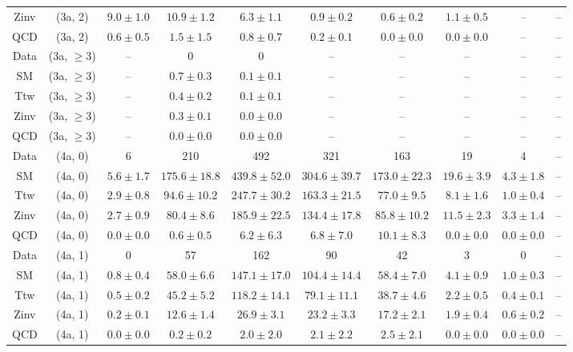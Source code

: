 \begin{table}[h!]
{\begin{tabular}{cccccccccc}
	Zinv & (3a, 2) & $9.0\pm 1.0$ & $10.9\pm 1.2$ & $6.3\pm 1.1$ & $0.9\pm 0.2$ & $0.6\pm 0.2$ & $1.1\pm 0.5$ & -- & -- \\[0.5ex] 
	QCD & (3a, 2) & $0.6\pm 0.5$ & $1.5\pm 1.5$ & $0.8\pm 0.7$ & $0.2\pm 0.1$ & $0.0\pm 0.0$ & $0.0\pm 0.0$ & -- & -- \\[0.5ex] 
	Data & (3a, $\ge3$) & -- & 0 & 0 & -- & -- & -- & -- & -- \\[0.5ex] 
	SM & (3a, $\ge3$) & -- & $0.7\pm 0.3$ & $0.1\pm 0.1$ & -- & -- & -- & -- & -- \\[0.5ex] 
	Ttw & (3a, $\ge3$) & -- & $0.4\pm 0.2$ & $0.1\pm 0.1$ & -- & -- & -- & -- & -- \\[0.5ex] 
	Zinv & (3a, $\ge3$) & -- & $0.3\pm 0.1$ & $0.0\pm 0.0$ & -- & -- & -- & -- & -- \\[0.5ex] 
	QCD & (3a, $\ge3$) & -- & $0.0\pm 0.0$ & $0.0\pm 0.0$ & -- & -- & -- & -- & -- \\[0.5ex] 
	Data & (4a, 0) & 6 & 210 & 492 & 321 & 163 & 19 & 4 & -- \\[0.5ex] 
	SM & (4a, 0) & $5.6\pm 1.7$ & $175.6\pm 18.8$ & $439.8\pm 52.0$ & $304.6\pm 39.7$ & $173.0\pm 22.3$ & $19.6\pm 3.9$ & $4.3\pm 1.8$ & -- \\[0.5ex] 
	Ttw & (4a, 0) & $2.9\pm 0.8$ & $94.6\pm 10.2$ & $247.7\pm 30.2$ & $163.3\pm 21.5$ & $77.0\pm 9.5$ & $8.1\pm 1.6$ & $1.0\pm 0.4$ & -- \\[0.5ex] 
	Zinv & (4a, 0) & $2.7\pm 0.9$ & $80.4\pm 8.6$ & $185.9\pm 22.5$ & $134.4\pm 17.8$ & $85.8\pm 10.2$ & $11.5\pm 2.3$ & $3.3\pm 1.4$ & -- \\[0.5ex] 
	QCD & (4a, 0) & $0.0\pm 0.0$ & $0.6\pm 0.5$ & $6.2\pm 6.3$ & $6.8\pm 7.0$ & $10.1\pm 8.3$ & $0.0\pm 0.0$ & $0.0\pm 0.0$ & -- \\[0.5ex] 
	Data & (4a, 1) & 0 & 57 & 162 & 90 & 42 & 3 & 0 & -- \\[0.5ex] 
	SM & (4a, 1) & $0.8\pm 0.4$ & $58.0\pm 6.6$ & $147.1\pm 17.0$ & $104.4\pm 14.4$ & $58.4\pm 7.0$ & $4.1\pm 0.9$ & $1.0\pm 0.3$ & -- \\[0.5ex] 
	Ttw & (4a, 1) & $0.5\pm 0.2$ & $45.2\pm 5.2$ & $118.2\pm 14.1$ & $79.1\pm 11.1$ & $38.7\pm 4.6$ & $2.2\pm 0.5$ & $0.4\pm 0.1$ & -- \\[0.5ex] 
	Zinv & (4a, 1) & $0.2\pm 0.1$ & $12.6\pm 1.4$ & $26.9\pm 3.1$ & $23.2\pm 3.3$ & $17.2\pm 2.1$ & $1.9\pm 0.4$ & $0.6\pm 0.2$ & -- \\[0.5ex] 
	QCD & (4a, 1) & $0.0\pm 0.0$ & $0.2\pm 0.2$ & $2.0\pm 2.0$ & $2.1\pm 2.2$ & $2.5\pm 2.1$ & $0.0\pm 0.0$ & $0.0\pm 0.0$ & -- \\[0.5ex] 

\end{tabular}}
\end{table}
